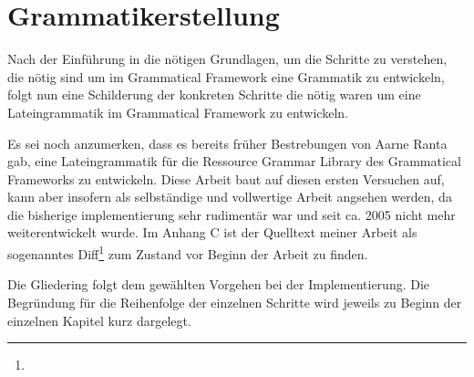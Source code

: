 \documentclass[12pt,abstract=on]{scrreprt}
\begin{document}
\chapter{Grammatikerstellung}
Nach der Einführung in die nötigen Grundlagen, um die Schritte zu verstehen, die nötig sind um im Grammatical Framework eine Grammatik zu entwickeln, folgt nun eine Schilderung der konkreten Schritte die nötig waren um eine Lateingrammatik im Grammatical Framework zu entwickeln. \par
Es sei noch anzumerken, dass es bereits früher Bestrebungen von Aarne Ranta gab, eine Lateingrammatik für die Ressource Grammar Library des Grammatical Frameworks zu entwickeln. Diese Arbeit baut auf diesen ersten Versuchen auf, kann aber insofern als selbständige und vollwertige Arbeit angsehen werden, da die bisherige implementierung sehr rudimentär war und seit ca. 2005 nicht mehr weiterentwickelt wurde. Im Anhang C ist der Quelltext meiner Arbeit als sogenanntes Diff\footnote{} zum Zustand vor Beginn der Arbeit zu finden. \par
Die Gliedering folgt dem gewählten Vorgehen bei der Implementierung. Die Begründung für die Reihenfolge der einzelnen Schritte wird jeweils zu Beginn der einzelnen Kapitel kurz dargelegt.
\pagebreak
\end{document}
